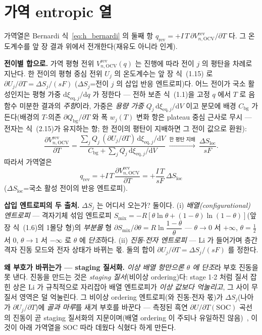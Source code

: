 \documentclass[11pt,a4paper]{article}
\newcommand{\dd}{\mathrm{d}}
\newcommand{\eq}{\mathrm{eq}}
\newcommand{\bg}{\mathrm{bg}}
\newcommand{\OCV}{\mathrm{OCV}}
\newcommand{\rev}{\mathrm{rev}}
\begin{document}
\section{가역 entropic 열}\label{sec:h_rev}
가역열은 Bernardi 식~\eqref{eq:h_bernardi} 의 둘째 항 $q_\rev=+I\,T\,\partial V_{n,\OCV}^\rev/\partial T$ 다. 그
온도계수를 앞 장 결과 위에서 전개한다(재유도 아니라 인계).

\textbf{전이별 합으로.} 가역 평형 전위 $V_{n,\OCV}^\rev(q)$ 는 진행에 따라 전이 $j$ 의 평탄을 차례로 지난다. 한
전이의 평형 중심 전위 $U_j$ 의 온도계수는 앞 장 식~(1.15) 로 $\partial U_j/\partial T=\Delta S_j/(sF)$
($\Delta S_j$=전이 $j$ 의 삽입 반응 엔트로피)다. 어느 전이가 국소 활성인지는 평형 가중 $\dd\xi_{\eq,j}/\dd q$ 가
정한다 — 전하 보존 식~(1.1)을 고정 $q$ 에서 $T$ 로 음함수 미분한 결과의 \emph{주항}이라, 가중은 \emph{용량 가중}
$Q_j\,\dd\xi_{\eq,j}/\dd V$ 이고 분모에 배경 $C_\bg$ 가 든다(배경의 $T$-의존 $\partial Q_\bg/\partial T$ 와 폭
$w_j(T)$ 변화 항은 plateau 중심 근사로 무시 — 전자는 식~(2.15)가 유지하는 항; 한 전이의 평탄이 지배하면 그 전이
값으로 환원):
\begin{equation}
\frac{\partial V_{n,\OCV}^\rev}{\partial T}
=\frac{\sum_j Q_j\,(\partial U_j/\partial T)\,\dd\xi_{\eq,j}/\dd V}{C_\bg+\sum_j Q_j\,\dd\xi_{\eq,j}/\dd V}
\ \xrightarrow{\text{한 평탄 지배}}\ \frac{\Delta S_\mathrm{loc}}{sF}.
\label{eq:h_dVdT}
\end{equation}
따라서 가역열은
\begin{equation}
\boxed{\;q_\rev=+I\,T\,\frac{\partial V_{n,\OCV}^\rev}{\partial T}=+\frac{I\,T}{sF}\,\Delta S_\mathrm{loc}\;}
\label{eq:h_qrev}
\end{equation}
($\Delta S_\mathrm{loc}$=국소 활성 전이의 반응 엔트로피).

\textbf{삽입 엔트로피의 두 출처.} $\Delta S_j$ 는 어디서 오는가? 둘이다. (i) \emph{배열(configurational) 엔트로피}
— 격자기체 섞임 엔트로피 $S_\mathrm{mix}=-R[\theta\ln\theta+(1-\theta)\ln(1-\theta)]$(앞 장 식~(1.6)의 1몰당 형)의 \emph{부분몰}
형 $\partial S_\mathrm{mix}/\partial\theta=R\ln\dfrac{1-\theta}{\theta}$ — $\theta\to0$ 서 $+\infty$, $\theta=\tfrac12$
서 $0$, $\theta\to1$ 서 $-\infty$ 로 $\theta$ 에 \emph{단조}하다. (ii) \emph{진동$\cdot$전자 엔트로피} — Li 가 들어가며
층간 격자 진동 모드와 전자 상태가 바뀌는 몫. 둘의 합이 $\partial U_j/\partial T=\Delta S_j/(sF)$ 를 정한다.

\textbf{왜 부호가 바뀌는가 — staging 질서화.} \emph{이상 배열 항만으론 $\theta$ 에 단조}라 부호 진동을 못 낸다.
진동을 만드는 것은 \emph{staging 질서}(비이상 ordering)다: stage 1$\cdot$2 처럼 질서 잡힌 상은 Li 가 규칙적으로
자리잡아 배열 엔트로피가 \emph{이상 값보다 억눌리고}, 그 사이 무질서 영역은 덜 억눌린다. 그 비이상 ordering
엔트로피(와 진동$\cdot$전자 몫)가 $\Delta S_j$(나아가 $\partial U_j/\partial T$)에 \emph{골과 마루}를 새겨 부호를
바꾼다 — 측정된 흑연 $\partial U/\partial T(\mathrm{SOC})$ 곡선의 진동이 곧 staging 질서화의 지문이며(배열 ordering
이 주되나 유일하진 않음)~\cite{reynier2004}, 이것이 아래 가역열을 SOC 따라 데웠다 식혔다 하게 만든다.
\end{document}
